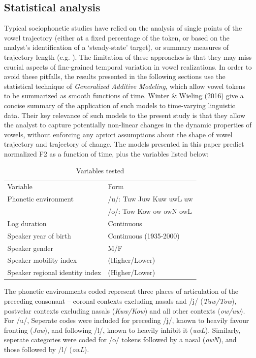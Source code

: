 \documentclass[12pt]{article}
\begin{document}
\subsection{Statistical analysis}

Typical sociophonetic studies have relied on the analysis of single points of the vowel trajectory (either at a fixed percentage of the token, or based on the analyst's identification of a `steady-state' target), or summary measures of trajectory length (e.g. ). The limitation of these approaches is that they may miss crucial aspects of fine-grained temporal variation in vowel realizations. In order to avoid these pitfalls, the results presented in the following sections use the statistical technique of \textit{Generalized Additive Modeling}, which allow vowel tokens to be summarized as smooth functions of time. Winter \& Wieling (2016) give a concise summary of the application of such models to time-varying linguistic data. Their key relevance of such models to the present study is that they allow the analyst to capture potentially non-linear changes in the dynamic properties of vowels, without enforcing any apriori assumptions about the shape of vowel trajectory and trajectory of change. The models presented in this paper predict normalized F2 as a function of time, plus the variables listed below:

\vspace*{6pt}
\begin{table}[!htbp]
\centering
\begin{tabular}{l|l}
Variable&Form \\
Phonetic environment & /u/: Tuw Juw Kuw uwL uw\\&/o/: Tow Kow ow owN owL\\
Log duration& Continuous \\
Speaker year of birth& Continuous (1935-2000)\\
Speaker gender& M/F \\
Speaker mobility index & (Higher/Lower) \\
Speaker regional identity index& (Higher/Lower) \\
\end{tabular}
\caption{Variables tested}
\end{table}
\vspace*{6pt}

The phonetic environments coded represent three places of articulation of the preceding consonant -- coronal contexts excluding nasals and /j/ (\textit{Tuw/Tow}), postvelar contexts excluding nasals (\textit{Kuw/Kow}) and all other contexts (\textit{ow/uw}). For /u/, Seperate codes were included for preceding /j/, known to heavily favour fronting (\textit{Juw}), and following /l/, known to heavily inhibit it (\textit{uwL}). Similarly, seperate categories were coded for /o/ tokens followed by a nasal (\textit{owN}), and those followed by /l/ (\textit{owL}).
\end{document}
